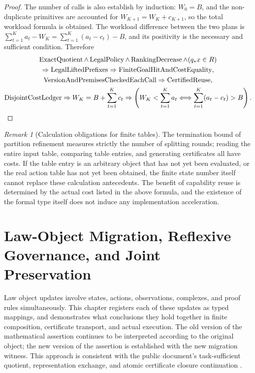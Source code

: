 \documentclass[12pt,a4paper,openany,notitlepage]{report}
\theoremstyle{plain}
\theoremstyle{definition}
\theoremstyle{remark}
\newtheorem{remark}[theorem]{Remark}
\begin{document}
\begin{CJK*}
\begin{proof}
The number of calls is also establish by induction: $W_0=B$, and the non-duplicate primitives are accounted for $W_{K+1}=W_K+c_{K+1}$, so the total workload formula is obtained. The workload difference between the two plans is $\sum_{t=1}^Ka_t-W_K=\sum_{t=1}^K(a_t-c_t)-B$, and its positivity is the necessary and sufficient condition. Therefore \begin{gather*}
 \operatorname{ExactQuotient}\land\operatorname{LegalPolicy}
 \land\operatorname{RankingDecrease}\land(q_*x\in R)\\
 \Rightarrow\operatorname{LegalLiftedPrefixes}
 \Rightarrow\operatorname{FiniteGoalHitAndCostEquality},\\
 \operatorname{VersionAndPremisesCheckedEachCall}
 \Rightarrow\operatorname{CertifiedReuse},\\
 \operatorname{DisjointCostLedger}
 \Rightarrow W_K=B+\sum_{t=1}^Kc_t
 \Rightarrow\left(W_K<\sum_{t=1}^Ka_t
 \Longleftrightarrow\sum_{t=1}^K(a_t-c_t)>B\right).\qedhere
\end{gather*}\end{proof}


\begin{remark}
[Calculation obligations for finite tables]The termination bound of partition refinement measures strictly the number of splitting rounds; reading the entire input table, comparing table entries, and generating certificates all have costs. If the table entry is an arbitrary object that has not yet been evaluated, or the real action table has not yet been obtained, the finite state number itself cannot replace these calculation antecedents. The benefit of capability reuse is determined by the actual cost listed in the above formula, and the existence of the formal type itself does not induce any implementation acceleration.\end{remark}


\chapter{Law-Object Migration, Reflexive Governance, and Joint Preservation}
\label{exp:ch:governance}


\label{hgov:sec:governance}

Law object updates involve states, actions, observations, complexes, and proof rules simultaneously. This chapter registers each of these updates as typed mappings, and demonstrates what conclusions they hold together in finite composition, certificate transport, and actual execution. The old version of the mathematical assertion continues to be interpreted according to the original object; the new version of the assertion is established with the new migration witness. This approach is consistent with the public document's task-sufficient quotient, representation exchange, and atomic certificate closure continuation \cite{S38,GFrameworkSynthesis}.


\end{CJK*}
\end{document}
